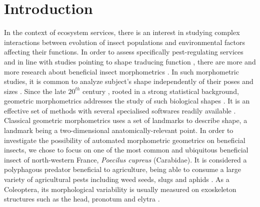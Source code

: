 \documentclass[review]{elsarticle}
\begin{document}
\linenumbers

\section{Introduction}

In the context of ecosystem services, there is an interest in studying complex interactions between evolution of insect populations and environmental factors affecting their functions. In order to assess specifically pest-regulating services and in line with studies pointing to shape traducing function \cite{klingenberg_evolution_2010}, there are more and more research about beneficial insect morphometrics \cite{sasakawa_utility_2016,raymond_combination_2014}. 
 In such morphometric studies, it is common to analyze subject's shape independently of their poses and sizes \cite{kendall_diffusion_1977}. Since the late $20^{th}$ century \cite{bookstein_foundations_1982}, rooted in a strong statistical background, geometric morphometrics addresses the study of such biological shapes \cite{rohlf_applications_1998}. It is an effective set of methods with several specialised softwares readily available \cite{adams_geomorph:_2013,klingenberg_morphoj:_2011}. Classical geometric morphometrics uses a set of landmarks to describe shape, a landmark being a two-dimensional anatomically-relevant point. In order to investigate the possibility of automated morphometric geometrics on beneficial insects, we chose to focus on one of the most common and ubiquitous beneficial insect of north-western France, \textit{Poecilus cupreus} (Carabidae). It is considered a polyphagous predator \cite{larochelle_1990} beneficial to agriculture, being able to consume a large variety of agricultural pests including weed seeds, slugs and aphids \cite{kromp_carabid_1999}. As a Coleoptera, its morphological variability is usually measured on exoskeleton structures such as the head, pronotum and elytra \cite{eldred_does_2016}. 
 
\end{document}
